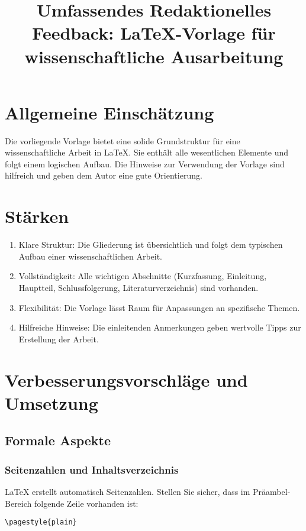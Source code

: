 \documentclass[a4paper,12pt]{article}
\title{Umfassendes Redaktionelles Feedback: LaTeX-Vorlage für wissenschaftliche Ausarbeitung}
\author{}
\date{}
\begin{document}
\maketitle

\tableofcontents

\section{Allgemeine Einschätzung}

Die vorliegende Vorlage bietet eine solide Grundstruktur für eine wissenschaftliche Arbeit in LaTeX. Sie enthält alle wesentlichen Elemente und folgt einem logischen Aufbau. Die Hinweise zur Verwendung der Vorlage sind hilfreich und geben dem Autor eine gute Orientierung.

\section{Stärken}

\begin{enumerate}
    \item Klare Struktur: Die Gliederung ist übersichtlich und folgt dem typischen Aufbau einer wissenschaftlichen Arbeit.
    \item Vollständigkeit: Alle wichtigen Abschnitte (Kurzfassung, Einleitung, Hauptteil, Schlussfolgerung, Literaturverzeichnis) sind vorhanden.
    \item Flexibilität: Die Vorlage lässt Raum für Anpassungen an spezifische Themen.
    \item Hilfreiche Hinweise: Die einleitenden Anmerkungen geben wertvolle Tipps zur Erstellung der Arbeit.
\end{enumerate}

\section{Verbesserungsvorschläge und Umsetzung}

\subsection{Formale Aspekte}

\subsubsection{Seitenzahlen und Inhaltsverzeichnis}
LaTeX erstellt automatisch Seitenzahlen. Stellen Sie sicher, dass im Präambel-Bereich folgende Zeile vorhanden ist:
\begin{lstlisting}
\pagestyle{plain}
\end{lstlisting}
\end{document}
